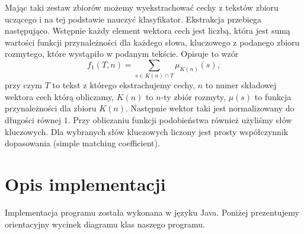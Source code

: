 \documentclass[a4paper]{classrep}
\begin{document}
Mając taki zestaw zbiorów możemy wyekstrachować cechy z tekstów zbioru uczącego i na tej podstawie nauczyć klasyfikator. Ekstrakcja przebiega następująco. Wstępnie każdy element wektora
cech jest liczbą, która jest sumą wartości funkcji przynależności dla każdego słowa, kluczowego z podanego zbioru rozmytego, które wystąpiło w podanym tekście.
Opisuje to wzór
\[f_1(T,n)=\sum_{s\in K(n) \cap T} \mu_{K(n)}(s),\]
przy czym \(T\) to tekst z którego ekstrachujemy cechy, \(n\) to numer składowej wektora cech którą obliczamy, \(K(n)\) to \(n\)-ty zbiór rozmyty, \(\mu(s)\) to funkcja przynależności
dla zbioru \(K(n)\).
Następnie wektor taki jest normalizowany do długości równej \(1\).
Przy obliczaniu funkcji podobieństwa również użyliśmy słów kluczowych. Dla wybranych słów kluczowych liczony jest prosty współczynnik dopasowania (simple matching coefficient).
%
%
\section{Opis implementacji}
Implementacja programu została wykonana w języku Java. Poniżej prezentujemy orientacyjny wycinek diagramu klas naszego programu.
\end{document}
